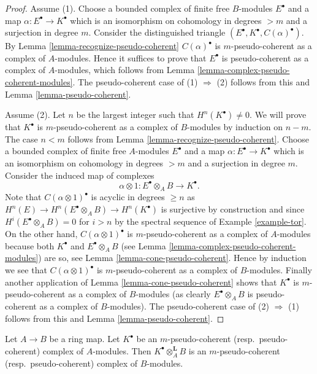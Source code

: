\begin{proof}
Assume (1). Choose a bounded complex of finite free $B$-modules
$E^\bullet$ and a map $\alpha : E^\bullet \to K^\bullet$ which is
an isomorphism on cohomology in degrees $> m$ and a surjection in degree $m$.
Consider the distinguished triangle
$(E^\bullet, K^\bullet, C(\alpha)^\bullet)$. By
Lemma \ref{lemma-recognize-pseudo-coherent}
$C(\alpha)^\bullet$ is $m$-pseudo-coherent as a complex of
$A$-modules. Hence it suffices to prove that $E^\bullet$ is
pseudo-coherent as a complex of $A$-modules, which follows from
Lemma \ref{lemma-complex-pseudo-coherent-modules}.
The pseudo-coherent case of (1) $\Rightarrow$ (2) follows from this and
Lemma \ref{lemma-pseudo-coherent}.

\medskip\noindent
Assume (2). Let $n$ be the largest integer such that $H^n(K^\bullet) \not = 0$.
We will prove that $K^\bullet$ is $m$-pseudo-coherent as a complex
of $B$-modules by induction on $n - m$. The case $n < m$ follows from
Lemma \ref{lemma-recognize-pseudo-coherent}.
Choose a bounded complex of finite free $A$-modules $E^\bullet$ and a
map $\alpha : E^\bullet \to K^\bullet$ which is an isomorphism on
cohomology in degrees $> m$ and a surjection in degree $m$.
Consider the induced map of complexes
$$
\alpha \otimes 1 : E^\bullet \otimes_A B \to K^\bullet.
$$
Note that $C(\alpha \otimes 1)^\bullet$ is acyclic in degrees
$\geq n$ as $H^n(E) \to H^n(E^\bullet \otimes_A B) \to H^n(K^\bullet)$
is surjective by construction and since $H^i(E^\bullet \otimes_A B) = 0$
for $i > n$ by the spectral sequence of
Example \ref{example-tor}.
On the other hand, $C(\alpha \otimes 1)^\bullet$
is $m$-pseudo-coherent as a complex of $A$-modules because
both $K^\bullet$ and $E^\bullet \otimes_A B$ (see
Lemma \ref{lemma-complex-pseudo-coherent-modules})
are so, see
Lemma \ref{lemma-cone-pseudo-coherent}.
Hence by induction we see that $C(\alpha \otimes 1)^\bullet$
is $m$-pseudo-coherent as a complex of $B$-modules. Finally
another application of
Lemma \ref{lemma-cone-pseudo-coherent}
shows that $K^\bullet$ is $m$-pseudo-coherent as a complex of $B$-modules
(as clearly $E^\bullet \otimes_A B$ is pseudo-coherent as a complex
of $B$-modules). The pseudo-coherent case
of (2) $\Rightarrow$ (1) follows from this and
Lemma \ref{lemma-pseudo-coherent}.
\end{proof}

\begin{lemma}
\label{lemma-pull-pseudo-coherent}
Let $A \to B$ be a ring map.
Let $K^\bullet$ be an $m$-pseudo-coherent (resp.\ pseudo-coherent)
complex of $A$-modules. Then $K^\bullet \otimes_A^{\mathbf{L}} B$
is an $m$-pseudo-coherent (resp.\ pseudo-coherent) complex of $B$-modules.
\end{lemma}

